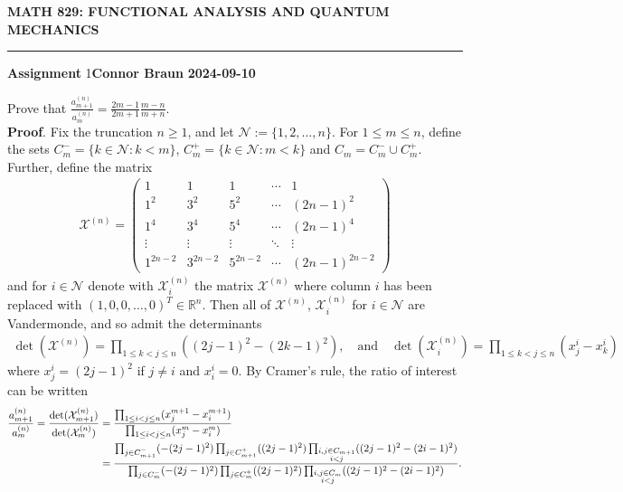 \documentclass[10pt]{article}
\newcommand{\mbb}[1]{\mathbb{#1}}
\newcommand{\1}[1]{\mathbbm{1}_{#1}}
\newcommand{\mc}[1]{\mathcal{#1}}
\begin{document}
    \begin{center}
        {\bf\large{MATH 829: FUNCTIONAL ANALYSIS AND QUANTUM MECHANICS}}
        \smallskip
        \hrule
        \smallskip
        {\bf Assignment} 1\hfill {\bf Connor Braun} \hfill {\bf 2024-09-10}
    \end{center}

    \vspace{5pt}
     Prove that $\tfrac{a^{(n)}_{m+1}}{a^{(n)}_m}=\frac{2m-1}{2m+1}\frac{m-n}{m+n}$.\\[5pt]
    {\bf Proof}. Fix the truncation $n\geq 1$, and let $\mc{N}:=\{1,2,\dots,n\}$. For $1\leq m\leq n$, define the sets $C_m^-=\{k\in\mc{N}:k<m\}$, $C_m^+=\{k\in\mc{N}:m<k\}$
    and $C_m=C_m^-\cup C_m^+$. Further, define the matrix
    \begin{align*}
        \mc{X}^{(n)}=\begin{pmatrix}
            1 & 1 & 1 & \cdots & 1\\
            1^2 & 3^2 & 5^2 & \cdots & (2n-1)^2\\
            1^4 & 3^4 & 5^4 & \cdots & (2n-1)^4\\
            \vdots & \vdots & \vdots& \ddots & \vdots\\
            1^{2n-2} & 3^{2n-2} & 5^{2n-2} & \cdots & (2n-1)^{2n-2} 
        \end{pmatrix}
    \end{align*}
    and for $i\in\mc{N}$ denote with $\mc{X}^{(n)}_i$ the matrix $\mc{X}^{(n)}$ where column $i$ has been replaced with $(1,0,0,\dots,0)^T\in\mbb{R}^n$. Then all of $\mc{X}^{(n)}$, $\mc{X}^{(n)}_i$ for $i\in\mc{N}$ are
    Vandermonde, and so admit the determinants
    \begin{align*}
        \det(\mc{X}^{(n)})=\prod_{1\leq k<j\leq n}((2j-1)^2-(2k-1)^2),\quad\text{and}\quad\det(\mc{X}_i^{(n)})=\prod_{1\leq k<j\leq n}(x^i_j-x^i_k)
    \end{align*}
    where $x_j^i=(2j-1)^2$ if $j\neq i$ and $x_i^i=0$. By Cramer's rule, the ratio of interest can be written
    \begin{align}
        \frac{a^{(n)}_{m+1}}{a^{(n)}_m}=\frac{\det(\mc{X}^{(n)}_{m+1})}{\det(\mc{X}^{(n)}_m)}&=\frac{\prod_{1\leq i<j\leq n}(x_j^{m+1}-x_i^{m+1})}{\prod_{1\leq i<j\leq n}(x_j^{m}-x_i^{m})}\notag\\
        &=\frac{\prod_{j\in C_{m+1}^-}(-(2j-1)^2)\prod_{j\in C_{m+1}^+}((2j-1)^2)\prod_{\substack{i,j\in C_{m+1} \\ i<j}}((2j-1)^2-(2i-1)^2)}{\prod_{j\in C_{m}^-}(-(2j-1)^2)\prod_{j\in C_{m}^+}((2j-1)^2)\prod_{\substack{i,j\in C_{m} \\ i<j}}((2j-1)^2-(2i-1)^2)}.\label{eq4}
    \end{align}
\end{document}
